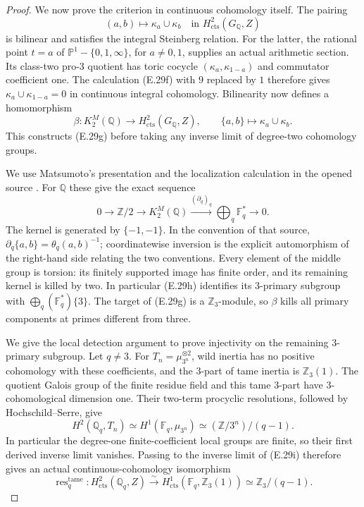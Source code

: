 \begin{proof}
We now prove the criterion in continuous cohomology itself.
The pairing
\[
 (a,b)\longmapsto\kappa_a\cup\kappa_b
 \quad\text{in }H^2_{\mathrm{cts}}(G_{\mathbb Q},Z)
\]
is bilinear and satisfies the integral Steinberg relation.
For the latter, the rational point $t=a$ of
$\mathbb P^1-\{0,1,\infty\}$, for $a\ne0,1$, supplies
an actual arithmetic section. Its class-two pro-$3$
quotient has toric cocycle $(\kappa_a,\kappa_{1-a})$ and
commutator coefficient one. The calculation (E.29f) with
$9$ replaced by $1$ therefore gives
$\kappa_a\cup\kappa_{1-a}=0$ in continuous integral
cohomology. Bilinearity now defines a homomorphism
\[
 \beta:K_2^M(\mathbb Q)\longrightarrow
 H^2_{\mathrm{cts}}(G_{\mathbb Q},Z),\qquad
 \{a,b\}\longmapsto\kappa_a\cup\kappa_b.                    \tag{E.29g}
\]
This constructs (E.29g) before taking any inverse limit of
degree-two cohomology groups.

We use Matsumoto's presentation and the localization
calculation in the opened source
\cite[III.6.1, III.6.5--III.6.5.1, III.5.2.2]{E_Kbook}.
For $\mathbb Q$ these give the exact sequence
\[
 0\longrightarrow\mathbb Z/2\longrightarrow K_2^M(\mathbb Q)
 \xrightarrow{(\partial_q)_q}
 \bigoplus_q\mathbb F_q^*\longrightarrow0.                  \tag{E.29h}
\]
The kernel is generated by $\{-1,-1\}$. In the convention
of that source, $\partial_q\{a,b\}=\theta_q(a,b)^{-1}$;
coordinatewise inversion is the explicit automorphism of
the right-hand side relating the two conventions.
Every element of the middle group is torsion: its finitely
supported image has finite order, and its remaining kernel
is killed by two. In particular (E.29h) identifies its
$3$-primary subgroup with
$\bigoplus_q(\mathbb F_q^*)\{3\}$.
The target of (E.29g) is a $\mathbb Z_3$-module, so
$\beta$ kills all primary components at primes different
from three.

We give the local detection argument to prove injectivity
on the remaining $3$-primary subgroup. Let $q\ne3$.
For $T_n=\mu_{3^n}^{\otimes2}$, wild inertia has no positive
cohomology with these coefficients, and the $3$-part of
tame inertia is $\mathbb Z_3(1)$. The quotient Galois group
of the finite residue field and this tame $3$-part have
$3$-cohomological dimension one. Their two-term procyclic
resolutions, followed by Hochschild--Serre, give
\[
 H^2(\mathbb Q_q,T_n)
  \simeq H^1(\mathbb F_q,\mu_{3^n})
  \simeq (\mathbb Z/3^n)/(q-1).                              \tag{E.29i}
\]
In particular the degree-one finite-coefficient local
groups are finite, so their first derived inverse limit
vanishes. Passing to the inverse limit of (E.29i) therefore
gives an actual continuous-cohomology isomorphism
\[
 \operatorname{res}^{\mathrm{tame}}_q:
 H^2_{\mathrm{cts}}(\mathbb Q_q,Z)
   \xrightarrow{\sim}
 H^1_{\mathrm{cts}}(\mathbb F_q,\mathbb Z_3(1))
   \simeq\mathbb Z_3/(q-1).                                 \tag{E.29j}
\]


\end{proof}
